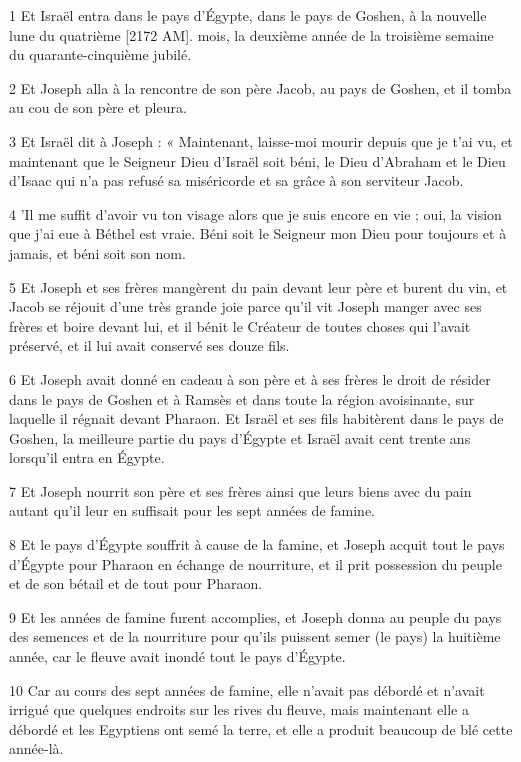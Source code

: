 \par 1 Et Israël entra dans le pays d'Égypte, dans le pays de Goshen, à la nouvelle lune du quatrième [2172 AM]. mois, la deuxième année de la troisième semaine du quarante-cinquième jubilé.
\par 2 Et Joseph alla à la rencontre de son père Jacob, au pays de Goshen, et il tomba au cou de son père et pleura.
\par 3 Et Israël dit à Joseph : « Maintenant, laisse-moi mourir depuis que je t'ai vu, et maintenant que le Seigneur Dieu d'Israël soit béni, le Dieu d'Abraham et le Dieu d'Isaac qui n'a pas refusé sa miséricorde et sa grâce à son serviteur Jacob.
\par 4 'Il me suffit d'avoir vu ton visage alors que je suis encore en vie ; oui, la vision que j'ai eue à Béthel est vraie. Béni soit le Seigneur mon Dieu pour toujours et à jamais, et béni soit son nom.
\par 5 Et Joseph et ses frères mangèrent du pain devant leur père et burent du vin, et Jacob se réjouit d'une très grande joie parce qu'il vit Joseph manger avec ses frères et boire devant lui, et il bénit le Créateur de toutes choses qui l'avait préservé, et il lui avait conservé ses douze fils.
\par 6 Et Joseph avait donné en cadeau à son père et à ses frères le droit de résider dans le pays de Goshen et à Ramsès et dans toute la région avoisinante, sur laquelle il régnait devant Pharaon. Et Israël et ses fils habitèrent dans le pays de Goshen, la meilleure partie du pays d'Égypte et Israël avait cent trente ans lorsqu'il entra en Égypte.
\par 7 Et Joseph nourrit son père et ses frères ainsi que leurs biens avec du pain autant qu'il leur en suffisait pour les sept années de famine.
\par 8 Et le pays d'Égypte souffrit à cause de la famine, et Joseph acquit tout le pays d'Égypte pour Pharaon en échange de nourriture, et il prit possession du peuple et de son bétail et de tout pour Pharaon.
\par 9 Et les années de famine furent accomplies, et Joseph donna au peuple du pays des semences et de la nourriture pour qu'ils puissent semer (le pays) la huitième année, car le fleuve avait inondé tout le pays d'Égypte.
\par 10 Car au cours des sept années de famine, elle n'avait pas débordé et n'avait irrigué que quelques endroits sur les rives du fleuve, mais maintenant elle a débordé et les Egyptiens ont semé la terre, et elle a produit beaucoup de blé cette année-là.
